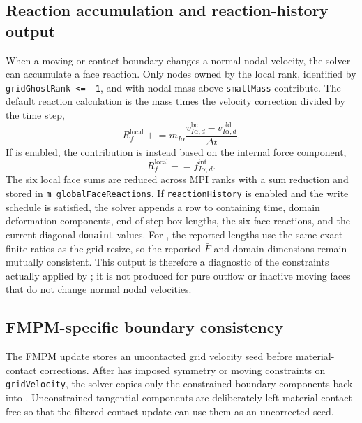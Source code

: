 \subsection{Reaction accumulation and reaction-history output}
\label{subsec:bc-reactions-internals}

When a moving or contact boundary changes a normal nodal velocity, the solver can accumulate a face reaction.  Only nodes owned by the local rank, identified by \texttt{gridGhostRank <= -1}, and with nodal mass above \texttt{smallMass} contribute.  The default reaction calculation is the mass times the velocity correction divided by the time step,
\begin{equation}
  R_f^{\mathrm{local}} \mathrel{+}= m_{I\alpha}\frac{v_{I\alpha,d}^{\mathrm{bc}}-v_{I\alpha,d}^{\mathrm{old}}}{\Delta t}.
  \label{eq:bc-reaction-momentum}
\end{equation}
If  is enabled, the contribution is instead based on the internal force component,
\begin{equation}
  R_f^{\mathrm{local}} \mathrel{-}= f_{I\alpha,d}^{\mathrm{int}}.
  \label{eq:bc-reaction-internal-force}
\end{equation}
The six local face sums are reduced across MPI ranks with a sum reduction and stored in \texttt{m\_globalFaceReactions}.  If \texttt{reactionHistory} is enabled and the write schedule is satisfied, the solver appends a row to  containing time, domain deformation components, end-of-step box lengths, the six face reactions, and the current diagonal \texttt{domainL} values.  For , the reported lengths use the same exact finite ratios as the grid resize, so the reported $\bar F$ and domain dimensions remain mutually consistent.  This output is therefore a diagnostic of the constraints actually applied by ; it is not produced for pure outflow or inactive moving faces that do not change normal nodal velocities.

\subsection{FMPM-specific boundary consistency}
\label{subsec:bc-fmpm-internals}

The FMPM update stores an uncontacted grid velocity seed before material-contact corrections.  After  has imposed symmetry or moving constraints on \texttt{gridVelocity}, the solver copies only the constrained boundary components back into .  Unconstrained tangential components are deliberately left material-contact-free so that the filtered contact update can use them as an uncorrected seed.

